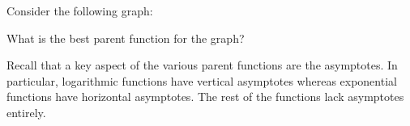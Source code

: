 \documentclass{ximera}
\begin{document}
\begin{problem}
    Consider the following graph:
    \begin{center}
    \end{center}
    
    What is the best parent function for the graph?
    
    \begin{multipleChoice}
    \end{multipleChoice}
    
    \begin{feedback}
        Recall that a key aspect of the various parent functions are the asymptotes. In particular, logarithmic functions have vertical asymptotes whereas exponential functions have horizontal asymptotes. The rest of the functions lack asymptotes entirely.
    \end{feedback}
        
\end{problem}
        
        
        
\end{document}
